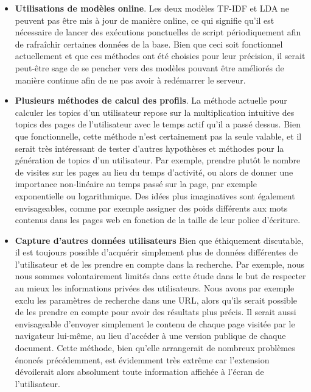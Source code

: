 \begin{itemize}
		\item \textbf{Utilisations de modèles online}. Les deux modèles TF-IDF et LDA ne peuvent pas être mis à jour de manière online, ce qui signifie qu'il est nécessaire de lancer des exécutions ponctuelles de script périodiquement afin de rafraîchir certaines données de la base. Bien que ceci soit fonctionnel actuellement et que ces méthodes ont été choisies pour leur précision, il serait peut-être sage de se pencher vers des modèles pouvant être améliorés de manière continue afin de ne pas avoir à redémarrer le serveur.
		\item \textbf{Plusieurs méthodes de calcul des profils}. La méthode actuelle pour calculer les topics d'un utilisateur repose sur la multiplication intuitive des topics des pages de l'utilisateur avec le temps actif qu'il a passé dessus. Bien que fonctionnelle, cette méthode n'est certainement pas la seule valable, et il serait très intéressant de tester d'autres hypothèses et méthodes pour la génération de topics d'un utilisateur. Par exemple, prendre plutôt le nombre de visites sur les pages au lieu du temps d'activité, ou alors de donner une importance non-linéaire au temps passé sur la page, par exemple exponentielle ou logarithmique. Des idées plus imaginatives sont également envisageables, comme par exemple assigner des poids différents aux mots contenus dans les pages web en fonction de la taille de leur police d'écriture.
		\item \textbf{Capture d'autres données utilisateurs} Bien que éthiquement discutable, il est toujours possible d'acquérir simplement plus de données différentes de l'utilisateur et de les prendre en compte dans la recherche. Par exemple, nous nous sommes volontairement limités dans cette étude dans le but de respecter au mieux les informations privées des utilisateurs. Nous avons par exemple exclu les paramètres de recherche dans une URL, alors qu'ils serait possible de les prendre en compte pour avoir des résultats plus précis. Il serait aussi envisageable d'envoyer simplement le contenu de chaque page visitée par le navigateur lui-même, au lieu d'accéder à une version publique de chaque document. Cette méthode, bien qu'elle arrangerait de nombreux problèmes énoncés précédemment, est évidemment très extrême car l'extension dévoilerait alors absolument toute information affichée à l'écran de l'utilisateur.
	\end{itemize}


